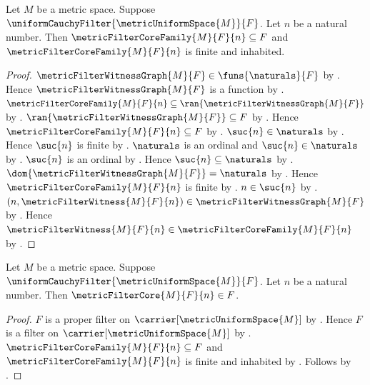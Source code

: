 \begin{proposition}\label{metric_filter_core_family_properties}
    Let $M$ be a metric space.
    Suppose $\uniformCauchyFilter{\metricUniformSpace{M}}{F}$.
    Let $n$ be a natural number.
    Then $\metricFilterCoreFamily{M}{F}{n}\subseteq F$ and
        $\metricFilterCoreFamily{M}{F}{n}$ is finite and inhabited.
\end{proposition}
\begin{proof}
    $\metricFilterWitnessGraph{M}{F}\in\funs{\naturals}{F}$
        by .
    Hence $\metricFilterWitnessGraph{M}{F}$ is a function
        by .
    $\metricFilterCoreFamily{M}{F}{n}
        \subseteq\ran{\metricFilterWitnessGraph{M}{F}}$
        by .
    $\ran{\metricFilterWitnessGraph{M}{F}}\subseteq F$
        by .
    Hence $\metricFilterCoreFamily{M}{F}{n}\subseteq F$
        by .
    $\suc{n}\in\naturals$ by .
    Hence $\suc{n}$ is finite
        by .
    $\naturals$ is an ordinal and $\suc{n}\in\naturals$
        by .
    $\suc{n}$ is an ordinal by .
    Hence $\suc{n}\subseteq\naturals$
        by .
    $\dom{\metricFilterWitnessGraph{M}{F}}=\naturals$
        by .
    Hence $\metricFilterCoreFamily{M}{F}{n}$ is finite
        by .
    $n\in\suc{n}$ by .
    $(n,\metricFilterWitness{M}{F}{n})
        \in\metricFilterWitnessGraph{M}{F}$
        by .
    Hence
        $\metricFilterWitness{M}{F}{n}
            \in\metricFilterCoreFamily{M}{F}{n}$
        by .
\end{proof}

\begin{proposition}\label{metric_filter_core_is_filter_member}
    Let $M$ be a metric space.
    Suppose $\uniformCauchyFilter{\metricUniformSpace{M}}{F}$.
    Let $n$ be a natural number.
    Then $\metricFilterCore{M}{F}{n}\in F$.
\end{proposition}
\begin{proof}
    $F$ is a proper filter on $\carrier[\metricUniformSpace{M}]$
        by .
    Hence $F$ is a filter on $\carrier[\metricUniformSpace{M}]$
        by .
    $\metricFilterCoreFamily{M}{F}{n}\subseteq F$ and
        $\metricFilterCoreFamily{M}{F}{n}$ is finite and inhabited
        by .
    Follows by .
\end{proof}

